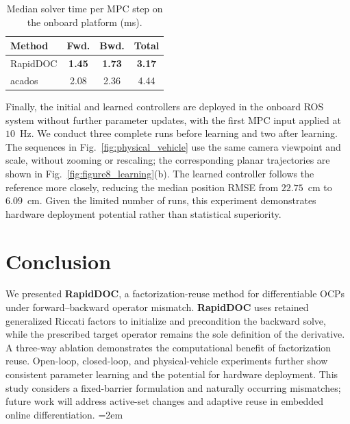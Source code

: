 \documentclass[letterpaper,10pt,conference]{ieeeconf}
\begin{document}
\begin{table}[!t]
\centering
\caption{Median solver time per MPC step on the onboard platform (ms).}
\label{tab:vehicle_learning_timing}
\small
\renewcommand{\arraystretch}{1.08}
\setlength{\tabcolsep}{5pt}
\begin{tabular*}{\columnwidth}
{@{\extracolsep{\fill}}lccc@{}}
\toprule
Method & Fwd. & Bwd. & Total \\
\midrule
RapidDOC   & \textbf{1.45} & \textbf{1.73} & \textbf{3.17} \\
acados & 2.08 & 2.36 & 4.44 \\
\bottomrule
\end{tabular*}
\end{table}

Finally, the initial and learned controllers are deployed in the
onboard ROS system without further parameter updates, with the first
MPC input applied at $10$~Hz. We conduct three complete runs before
learning and two after learning. The sequences in
Fig.~\ref{fig:physical_vehicle} use the same camera viewpoint and scale,
without zooming or rescaling; the corresponding planar trajectories are
shown in Fig.~\ref{fig:figure8_learning}(b). The learned controller
follows the reference more closely, reducing the median position RMSE
from $22.75$~cm to $6.09$~cm. Given the limited number of runs, this
experiment demonstrates hardware deployment potential rather than
statistical superiority.

\section{Conclusion}

We presented \textbf{RapidDOC}, a factorization-reuse method for
differentiable OCPs under forward--backward operator mismatch.
\textbf{RapidDOC} uses retained generalized Riccati factors to initialize
and precondition the backward solve, while the prescribed target
operator remains the sole definition of the derivative.
A three-way ablation demonstrates the computational benefit of
factorization reuse. Open-loop, closed-loop, and physical-vehicle
experiments further show consistent parameter learning and the
potential for hardware deployment. This study considers a
fixed-barrier formulation and naturally occurring mismatches;
future work will address active-set changes and adaptive reuse
in embedded online differentiation.
\begingroup
{}
\emergencystretch=2em



\endgroup
\end{document}
